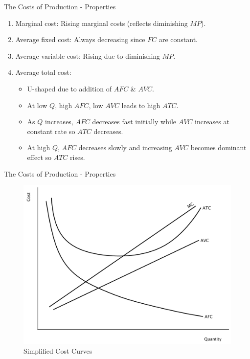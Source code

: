 \documentclass[xcolor={dvipsnames},pdf, hyperref={colorlinks=true, citecolor=ForestGreen, linkcolor=BlueViolet, urlcolor=Magenta}]{beamer}
\begin{document}
\begin{frame}{The Costs of Production - Properties}

	\begin{enumerate}
		\item Marginal cost: Rising marginal costs (reflects diminishing $MP$). 
		\item Average fixed cost: Always decreasing since $FC$ are constant.
		\item Average variable cost: Rising due to diminishing $MP$.
		\item Average total cost: 
		\begin{itemize}
			\item U-shaped due to addition of $AFC$ \& $AVC$.
			\item At low $Q$, high $AFC$, low $AVC$ leads to high $ATC$.
			\item As $Q$ increases, $AFC$ decreases fast initially while $AVC$ increases at constant rate so $ATC$ decreases.
			\item At high $Q$, $AFC$ decreases slowly and increasing $AVC$ becomes dominant effect so $ATC$ rises.
		\end{itemize}
	\end{enumerate}
\end{frame}	

\begin{frame}[b]{The Costs of Production - Properties}
	\begin{figure}[H]
		\centering
		\includegraphics[scale=.35]{plot57.pdf}
		\caption{Simplified Cost Curves}
	\end{figure}
\end{frame}
	
\end{document}
